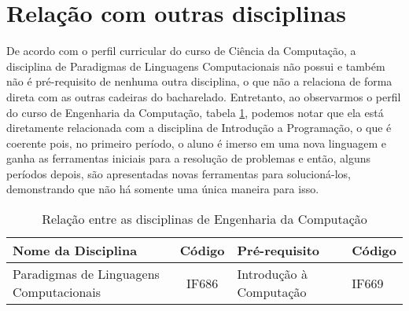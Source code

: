 \documentclass[10pt]{article}
\begin{document}
\section{Relação com outras disciplinas}
\justify
De acordo com o perfil curricular do curso de Ciência da Computação, a disciplina de Paradigmas de Linguagens Computacionais não possui e também não é pré-requisito de nenhuma outra disciplina, o que não a relaciona de forma direta com as outras cadeiras do bacharelado. Entretanto, ao observarmos o perfil do curso de Engenharia da Computação, tabela \ref{tab:relacaoDisciplinas}, podemos notar que ela está diretamente relacionada com a disciplina de Introdução a Programação, o que é coerente pois, no primeiro período, o aluno é imerso em uma nova linguagem e ganha as ferramentas iniciais para a resolução de problemas e então, alguns períodos depois, são apresentadas novas ferramentas para solucioná-los, demonstrando que não há somente uma única maneira para isso.

\begin{table}[h]
\centering
\begin{tabular}{p{3.5cm}|c|p{2.5cm}|l}
Nome da Disciplina & Código & Pré-requisito & Código\\
\hline\hline
Paradigmas de Linguagens Computacionais & IF686 & Introdução à Computação & IF669
\end{tabular}
\caption{Relação entre as disciplinas de Engenharia da Computação}
\label{tab:relacaoDisciplinas}
\end{table}



\end{document}
